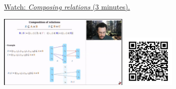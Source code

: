 
\begin{minipage}{10cm}
    \href{https://act4e-spring21.netlify.app/videos/spring2021-relations:relations:comp-rel.html}{Watch: \emph{Composing relations} (3 minutes).}
        
    \href{https://act4e-spring21.netlify.app/videos/spring2021-relations:relations:comp-rel.html}{\includegraphics[height=3.5cm]{spring2021-relations:relations:comp-rel/thumbnails.jpg}}
    \href{https://act4e-spring21.netlify.app/videos/spring2021-relations:relations:comp-rel.html}{\includegraphics[height=2.5cm]{spring2021-relations:relations:comp-rel/qrcode.png}}
\end{minipage}
